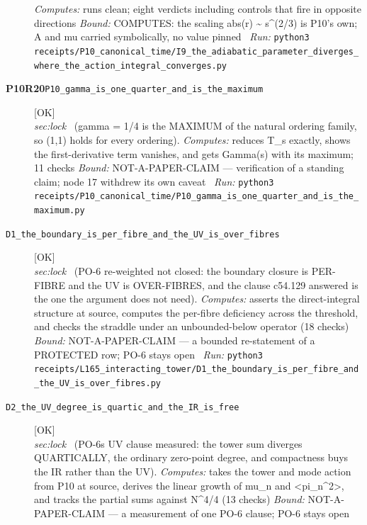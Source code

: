 \begin{description}
\emph{Computes:} runs clean; eight verdicts including controls that fire in opposite directions
 \emph{Bound:} COMPUTES: the scaling abs(r) \textasciitilde{} s\textasciicircum{}(2/3) is P10's own; A and mu carried symbolically, no value pinned
\ \emph{Run:} \texttt{python3 receipts/P10\_canonical\_time/I9\_the\_adiabatic\_parameter\_diverges\_where\_the\_action\_integral\_converges.py}
\item[\rcptlabel{P10_gamma_is_one_quarter_and_is_the_maximum}{P10R20}\textbf{P10R20}\quad\texttt{P10\_gamma\_is\_one\_quarter\_and\_is\_the\_maximum}]\hfill\textsf{[OK]}\\
\textit{sec:lock} \ (gamma = 1/4 is the MAXIMUM of the natural ordering family, so (1,1) holds for every ordering). 
\emph{Computes:} reduces T\_s exactly, shows the first-derivative term vanishes, and gets Gamma(s) with its maximum; 11 checks
 \emph{Bound:} NOT-A-PAPER-CLAIM --- verification of a standing claim; node 17 withdrew its own caveat
\ \emph{Run:} \texttt{python3 receipts/P10\_canonical\_time/P10\_gamma\_is\_one\_quarter\_and\_is\_the\_maximum.py}
\item[\label{rcpt:D1_the_boundary_is_per_fibre_and_the_UV_is_over_fibres}\textbf{}\quad\texttt{D1\_the\_boundary\_is\_per\_fibre\_and\_the\_UV\_is\_over\_fibres}]\hfill\textsf{[OK]}\\
\textit{sec:lock} \ (PO-6 re-weighted not closed: the boundary closure is PER-FIBRE and the UV is OVER-FIBRES, and the clause c54.129 answered is the one the argument does not need). 
\emph{Computes:} asserts the direct-integral structure at source, computes the per-fibre deficiency across the threshold, and checks the straddle under an unbounded-below operator (18 checks)
 \emph{Bound:} NOT-A-PAPER-CLAIM --- a bounded re-statement of a PROTECTED row; PO-6 stays open
\ \emph{Run:} \texttt{python3 receipts/L165\_interacting\_tower/D1\_the\_boundary\_is\_per\_fibre\_and\_the\_UV\_is\_over\_fibres.py}
\item[\label{rcpt:D2_the_UV_degree_is_quartic_and_the_IR_is_free}\textbf{}\quad\texttt{D2\_the\_UV\_degree\_is\_quartic\_and\_the\_IR\_is\_free}]\hfill\textsf{[OK]}\\
\textit{sec:lock} \ (PO-6s UV clause measured: the tower sum diverges QUARTICALLY, the ordinary zero-point degree, and compactness buys the IR rather than the UV). 
\emph{Computes:} takes the tower and mode action from P10 at source, derives the linear growth of mu\_n and <pi\_n\textasciicircum{}2>, and tracks the partial sums against N\textasciicircum{}4/4 (13 checks)
 \emph{Bound:} NOT-A-PAPER-CLAIM --- a measurement of one PO-6 clause; PO-6 stays open

\end{description}
